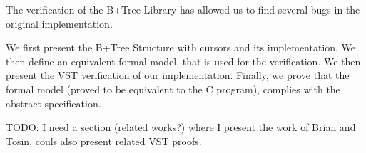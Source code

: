   The verification of the B+Tree Library has allowed us to find several bugs in the original implementation.

  We first present the B+Tree Structure with cursors and its implementation.
  We then define an equivalent formal model, that is used for the verification.
  We then present the VST verification of our implementation.
  Finally, we prove that the formal model (proved to be equivalent to the C program), complies with the abstract specification.

TODO: I need a section (related works?) where I present the work of Brian and Tosin. couls also present related VST proofs.

